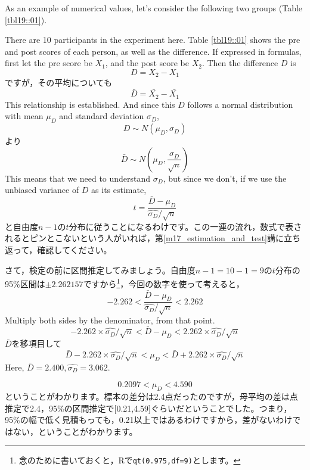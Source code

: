 \documentclass{ltjsarticle}
\begin{document}
As an example of numerical values, let's consider the following two groups (Table \ref{tbl19::01}).

There are 10 participants in the experiment here. Table \ref{tbl19::01} shows the pre and post scores of each person, as well as the difference. If expressed in formulas, first let the pre score be $X_1$, and the post score be $X_2$. Then the difference $D$ is
\[ D = X_2 - X_1 \]
ですが，その平均についても
\[ \bar{D} = \bar{X_2} - \bar{X_1} \]
This relationship is established. And since this $D$ follows a normal distribution with mean $\mu_D$ and standard deviation $\sigma_D$,
\[ D \sim N(\mu_D,\sigma_D)\]
より
\[ \bar{D} \sim N(\mu_D,\frac{\sigma_D}{\sqrt{n}}) \]
This means that we need to understand $\sigma_D$, but since we don't, if we use the unbiased variance of $D$ as its estimate,
\[ t = \frac{\bar{D}-\mu_D}{\hat{\sigma_D}/\sqrt{n}} \]
と自由度$n-1$の$t$分布に従うことになるわけです。この一連の流れ，数式で表されるとピンとこないという人がいれば，第\ref{m17_estimation_and_test}講に立ち返って，確認してください。

さて，検定の前に区間推定してみましょう。自由度$n-1=10-1=9$の$t$分布の95\%区間は$\pm 2.262157$ですから\footnote{念のために書いておくと，Rで\texttt{qt(0.975,df=9)}とします。}，今回の数字を使って考えると，
\[ -2.262 < \frac{\bar{D}-\mu_D}{\hat{\sigma_D}/\sqrt{n}} < 2.262 \]
Multiply both sides by the denominator, from that point.
\[ -2.262 \times \hat{\sigma_D}/\sqrt{n} < \bar{D}-\mu_D < 2.262 \times \hat{\sigma_D}/\sqrt{n} \]
$\bar{D}$を移項目して
\[ \bar{D}-2.262 \times \hat{\sigma_D}/\sqrt{n} < \mu_D < \bar{D}+2.262\times \hat{\sigma_D}/\sqrt{n} \]
Here, $\bar{D} = 2.400, \hat{\sigma_D} = 3.062$.

\[ 0.2097 < \mu_D < 4.590 \]
ということがわかります。標本の差分は2.4点だったのですが，母平均の差は点推定で2.4，95\%の区間推定で[0.21,4.59]ぐらいだということでした。つまり，95\%の幅で低く見積もっても，0.21以上ではあるわけですから，差がないわけではない，ということがわかります。
\end{document}
